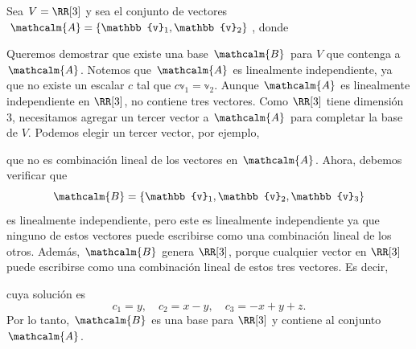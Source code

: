 \begin{examplebox}{}{}
    Sea $V = \RR[3]$ y sea el conjunto de vectores $\mathcalm{A} = \{ \mathbb{v}_1, \mathbb{v}_2 \}$, donde
    \begin{matrizn}
    \end{matrizn}
    Queremos demostrar que existe una base $\mathcalm{B}$ para $V$ que contenga a $\mathcalm{A}$. Notemos que $\mathcalm{A}$ es linealmente independiente, ya que no existe un escalar $c$ tal que $c\mathbb{v}_1 = \mathbb{v}_2$. Aunque $\mathcalm{A}$ es linealmente independiente en $\RR[3]$, no contiene tres vectores. Como $\RR[3]$ tiene dimensión 3, necesitamos agregar un tercer vector a $\mathcalm{A}$ para completar la base de $V$. Podemos elegir un tercer vector, por ejemplo,
    \begin{matrizn}
    \end{matrizn}
    que no es combinación lineal de los vectores en $\mathcalm{A}$. Ahora, debemos verificar que
    $$\mathcalm{B} = \{ \mathbb{v}_1, \mathbb{v}_2, \mathbb{v}_3 \}$$
    es linealmente independiente, pero este es linealmente independiente ya que ninguno de estos vectores puede escribirse como una combinación lineal de los otros. Además, $\mathcalm{B}$ genera $\RR[3]$, porque cualquier vector en $\RR[3]$ puede escribirse como una combinación lineal de estos tres vectores. Es decir,
    \begin{matrizn}
    \end{matrizn}
    cuya solución es
    $$c_1 = y, \quad c_2 = x - y, \quad c_3 = -x + y + z.$$
    Por lo tanto, $\mathcalm{B}$ es una base para $\RR[3]$ y contiene al conjunto $\mathcalm{A}$.
\end{examplebox}

